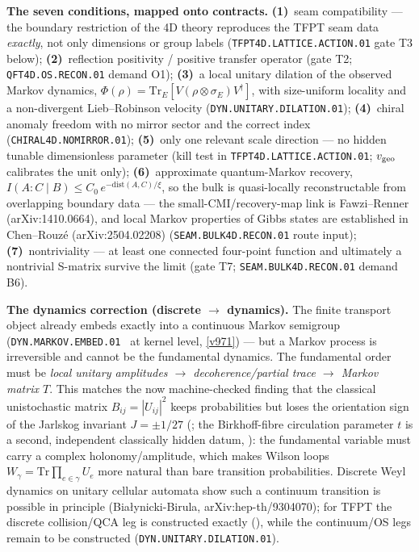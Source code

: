 \par\smallskip\noindent\textbf{The seven conditions, mapped onto contracts.}
\textbf{(1)}~seam compatibility --- the boundary restriction of the 4D theory reproduces the
TFPT seam data \emph{exactly}, not only dimensions or group labels
(\texttt{TFPT4D.LATTICE.ACTION.01} gate T3 below);
\textbf{(2)}~reflection positivity / positive transfer operator (gate T2;
\texttt{QFT4D.OS.RECON.01} demand O1);
\textbf{(3)}~a local unitary dilation of the observed Markov dynamics,
$\Phi(\rho)=\mathrm{Tr}_E[V(\rho\otimes\sigma_E)V^\dagger]$, with size-uniform locality and a
non-divergent Lieb--Robinson velocity (\texttt{DYN.UNITARY.DILATION.01});
\textbf{(4)}~chiral anomaly freedom with no mirror sector and the correct index
(\texttt{CHIRAL4D.NOMIRROR.01});
\textbf{(5)}~only one relevant scale direction --- no hidden tunable dimensionless parameter
(kill test in \texttt{TFPT4D.LATTICE.ACTION.01}; $v_{\rm geo}$ calibrates the unit only);
\textbf{(6)}~approximate quantum-Markov recovery,
$I(A{:}C\mid B)\le C_0\,e^{-\mathrm{dist}(A,C)/\xi}$, so the bulk is quasi-locally
reconstructable from overlapping boundary data --- the small-CMI/recovery-map link is
Fawzi--Renner (arXiv:1410.0664), and local Markov properties of Gibbs states are established in
Chen--Rouz\'e (arXiv:2504.02208) (\texttt{SEAM.BULK4D.RECON.01} route input);
\textbf{(7)}~nontriviality --- at least one connected four-point function and ultimately a
nontrivial S-matrix survive the limit (gate T7; \texttt{SEAM.BULK4D.RECON.01} demand B6).

\par\smallskip\noindent\textbf{The dynamics correction (discrete $\to$ dynamics).}  The finite
transport object already embeds exactly into a continuous Markov semigroup
(\texttt{DYN.MARKOV.EMBED.01} \mE\ at kernel level, \vref{v971}) --- but a Markov process is
irreversible and cannot be the fundamental dynamics.  The fundamental order must be
\emph{local unitary amplitudes $\to$ decoherence/partial trace $\to$ Markov matrix $T$}.  This
matches the now machine-checked finding that the classical unistochastic matrix $B_{ij}=|U_{ij}|^2$
keeps probabilities but loses the orientation sign of the Jarlskog invariant $J=\pm1/27$
(; the Birkhoff-fibre circulation parameter $t$ is a
second, independent classically hidden datum, ): the fundamental
variable must carry a complex
holonomy/amplitude, which makes Wilson loops $W_\gamma=\mathrm{Tr}\prod_{e\in\gamma}U_e$ more
natural than bare transition probabilities.  Discrete Weyl dynamics on unitary cellular automata
show such a continuum transition is possible in principle (Bia\l ynicki-Birula,
arXiv:hep-th/9304070); for TFPT the discrete collision/QCA leg is constructed exactly
(), while the continuum/OS legs remain to be constructed
(\texttt{DYN.UNITARY.DILATION.01}).

